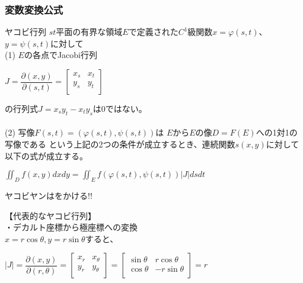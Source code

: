 \documentclass[a4paper]{jsarticle}
\begin{document}
\subsubsection{変数変換公式}
\begin{itembox}[l]{ヤコビ行列}
    $st$平面の有界な領域$E$で定義された$C^1$級関数$x=\varphi\left(s,t\right)$、$y=\psi\left(s,t\right)$に対して\\
    (1) $E$の各点でJacobi行列
    \begin{center}
        $J=\dfrac{\partial\left(x,y\right)}{\partial\left(s,t\right)}=\begin{bmatrix}
                x_s & x_t \\
                y_s & y_t \\
            \end{bmatrix}
        $
    \end{center}
    の行列式$J=x_sy_t-x_ty_s$は$0$ではない。\\\\
    (2) 写像$F\left(s,t\right)=\left(\varphi\left(s,t\right),\psi\left(s,t\right)\right)$は
    $E$から$E$の像$D=F\left(E\right)$への1対1の写像である
    という上記の2つの条件が成立するとき、連続関数$s\left(x,y\right)$に対して以下の式が成立する。\\
    \begin{center}
        $\displaystyle\iint_Df\left(x,y\right)dxdy=\iint_Ef\left(\varphi\left(s,t\right),\psi\left(s,t\right)\right)|J|dsdt$
    \end{center}
    ヤコビヤンはをかける!!
\end{itembox}
【代表的なヤコビ行列】\\
・デカルト座標から極座標への変換\\
$x=r\cos\theta,y=r\sin\theta$すると、\\
\begin{center}
    $|J|=\dfrac{\partial\left(x,y\right)}{\partial\left(r,\theta\right)}=
        \begin{bmatrix}
            x_r & x_\theta \\
            y_r & y_\theta \\
        \end{bmatrix}
        =
        \begin{bmatrix}
            \sin\theta & r\cos\theta  \\
            \cos\theta & -r\sin\theta \\
        \end{bmatrix}
        =r
    $
\end{center}
\end{document}
